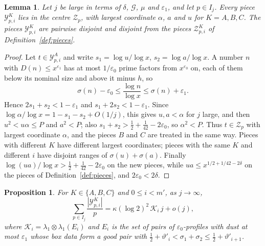 \documentclass[aps,prd,twocolumn,superscriptaddress,nofootinbib,longbibliography,floatfix,showkeys,nobalancelastpage,amsmath,amssymb,10pt]{revtex4-2}
\theoremstyle{plain}
\newtheorem{proposition}[theorem]{Proposition}
\newtheorem{lemma}[theorem]{Lemma}
\theoremstyle{definition}
\theoremstyle{plain}
\newcommand{\eps}{\varepsilon}
\newcommand{\Zc}{\mathcal{Z}}
\begin{document}
\begin{lemma}\label{lem:deeppieces}
Let $j$ be large in terms of $\delta$, $\mathcal G$, $\mu$ and $\eps_1$, and let $p\in I_j$. Every piece $\mathcal Y^K_{p,i}$ lies in the centre $\Zc_p$, with largest coordinate $\alpha$, $a$ and $u$ for $K=A,B,C$. The pieces $\mathcal Y^K_{p,i}$ are pairwise disjoint and disjoint from the pieces $\Zc^K_{p,i}$ of Definition~\ref{def:pieces}.
\end{lemma}

\begin{proof}
Let $t\in\mathcal Y^A_{p,i}$ and write $s_1=\log u/\log x$, $s_2=\log a/\log x$. A number $n$ with $D(n)\le x^{\eps_1}$ has at most $1/\eps_0$ prime factors from $x^{\eps_0}$ on, each of them below its nominal size and above it minus $h$, so
\[
\sigma(n)-\eps_0\le\frac{\log n}{\log x}\le\sigma(n)+\eps_1.
\]
Hence $2s_1+s_2<1-\eps_1$ and $s_1+2s_2<1-\eps_1$. Since $\log\alpha/\log x=1-s_1-s_2+O(1/j)$, this gives $u,a<\alpha$ for $j$ large, and then $u^2<u\alpha\le P$ and $a^2<P$; also $s_1+s_2>\frac12+\frac1{42}-2\eps_0$, so $\alpha^2<P$. Thus $t\in\Zc_p$ with largest coordinate $\alpha$, and the pieces $B$ and $C$ are treated in the same way. Pieces with different $K$ have different largest coordinates; pieces with the same $K$ and different $i$ have disjoint ranges of $\sigma(u)+\sigma(a)$. Finally $\log(ua)/\log x>\frac12+\frac1{42}-2\eps_0$ on the new pieces, while $ua\le x^{1/2+1/42-2\delta}$ on the pieces of Definition~\ref{def:pieces}, and $2\eps_0<2\delta$.
\end{proof}

\begin{proposition}\label{prop:deep}
For $K\in\{A,B,C\}$ and $0\le i<m'$, as $j\to\infty$,
\[
\sum_{p\in I_j}\frac{|\mathcal Y^K_{p,i}|}p=\kappa(\log2)^2\,\mathcal K_i\,j+o(j),
\]
where $\mathcal K_i=\lambda_1\otimes\lambda_1(E_i)$ and $E_i$ is the set of pairs of $\eps_0$-profiles with dust at most $\eps_1$ whose box data form a good pair with $\frac12+\vartheta'_i<\sigma_1+\sigma_2\le\frac12+\vartheta'_{i+1}$.
\end{proposition}
\end{document}
